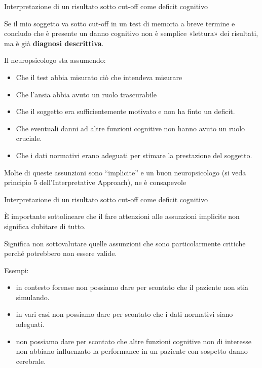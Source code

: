 \documentclass[
  ignorenonframetext,
  aspectratio=169,
]{beamer}
\providecommand{\tightlist}{%
  \setlength{\itemsep}{0pt}\setlength{\parskip}{0pt}}
\begin{document}
\begin{frame}{\normalsize Interpretazione di un risultato sotto cut-off
come deficit cognitivo}
\label{interpretazione-di-un-risultato-sotto-cut-off-come-deficit-cognitivo}
\small

Se il mio soggetto va sotto cut-off in un test di memoria a breve
termine e concludo che è presente un danno cognitivo non è semplice
«lettura» dei risultati, ma è già \textbf{diagnosi descrittiva}.

Il neuropsicologo sta assumendo:

\begin{itemize}
\tightlist
\item
  Che il test abbia misurato ciò che intendeva misurare \pause
\item
  Che l'ansia abbia avuto un ruolo trascurabile \pause
\item
  Che il soggetto era sufficientemente motivato e non ha finto un
  deficit. \pause
\item
  Che eventuali danni ad altre funzioni cognitive non hanno avuto un
  ruolo cruciale. \pause
\item
  Che i dati normativi erano adeguati per stimare la prestazione del
  soggetto. \pause
\end{itemize}

Molte di queste assunzioni sono ``implicite'' e un buon neuropsicologo
(si veda principio 5 dell'Interpretative Approach), ne è consapevole
\end{frame}

\begin{frame}{\normalsize Interpretazione di un risultato sotto cut-off
come deficit cognitivo}
\label{interpretazione-di-un-risultato-sotto-cut-off-come-deficit-cognitivo-1}
\small

È importante sottolineare che il fare attenzioni alle assunzioni
implicite non significa dubitare di tutto.

Significa non sottovalutare quelle assunzioni che sono particolarmente
critiche perché potrebbero non essere valide.

Esempi: \pause

\begin{itemize}
\tightlist
\item
  in contesto forense non possiamo dare per scontato che il paziente non
  stia simulando.\pause
\item
  in vari casi non possiamo dare per scontato che i dati normativi siano
  adeguati.\pause
\item
  non possiamo dare per scontato che altre funzioni cognitive non di
  interesse non abbiano influenzato la performance in un paziente con
  sospetto danno cerebrale.
\end{itemize}
\end{frame}
\end{document}
